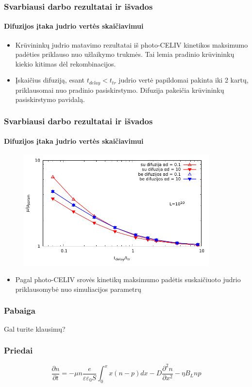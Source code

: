\documentclass{beamer}
\begin{document}
  \begin{frame}
    \frametitle{Svarbiausi darbo rezultatai ir išvados}
    \framesubtitle{Difuzijos įtaka judrio vertės skaičiavimui}
    \begin{itemize}
      \item Krūvininkų judrio matavimo rezultatai iš photo-CELIV kinetikos maksimumo padėties priklauso nuo užlaikymo trukmės. Tai lemia pradinio krūvininkų kiekio kitimas dėl rekombinacijos.
      \item Įskaičius difuziją, esant $t_{delay} < t_{tr}$ judrio vertė papildomai pakinta iki 2 kartų, priklausomai nuo pradinio pasiskirstymo. Difuzija pakeičia krūvininkų pasiskirstymo pavidalą.
    \end{itemize}
  \end{frame}
    
  \begin{frame}
    \frametitle{Svarbiausi darbo rezultatai ir išvados}
    \framesubtitle{Difuzijos įtaka judrio vertės skaičiavimui}
    \begin{figure}
    	\includegraphics[width=0.9\textwidth]{./media/pdf/log_mobility.pdf}
    \end{figure}
    \begin{itemize}
    \item Pagal photo-CELIV srovės kinetikų maksimumo padėtis suskaičiuoto judrio priklausomybė nuo simuliacijos parametrų
    \end{itemize}
  \end{frame}
  
  \begin{frame}
  \frametitle{Pabaiga}
  Gal turite klausimų?
  \end{frame}
  
  \begin{frame}
  \frametitle{Priedai}
  \begin{equation}
  \frac{\partial n}{\partial t} = -\mu n \frac{e}{\varepsilon \varepsilon_0 S} \int_{0}^{x} x(n-p)dx -D \frac{\partial^2 n}{\partial x^2} -\eta B_L n p
  \end{equation}
  \end{frame}
  
\end{document}
